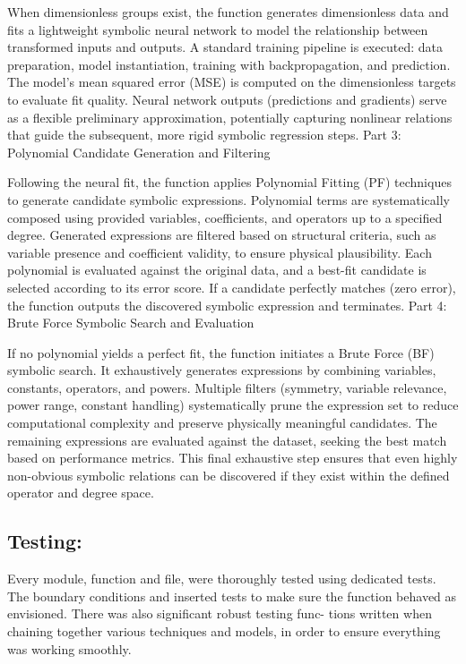 \documentclass{article}
\begin{document}
When dimensionless groups exist, the function generates dimensionless data and fits a lightweight symbolic neural network to model the relationship between transformed inputs and outputs. A standard training pipeline is executed: data preparation, model instantiation, training with backpropagation, and prediction. The model’s mean squared error (MSE) is computed on the dimensionless targets to evaluate fit quality. Neural network outputs (predictions and gradients) serve as a flexible preliminary approximation, potentially capturing nonlinear relations that guide the subsequent, more rigid symbolic regression steps.
Part 3: Polynomial Candidate Generation and Filtering

Following the neural fit, the function applies Polynomial Fitting (PF) techniques to generate candidate symbolic expressions. Polynomial terms are systematically composed using provided variables, coefficients, and operators up to a specified degree. Generated expressions are filtered based on structural criteria, such as variable presence and coefficient validity, to ensure physical plausibility. Each polynomial is evaluated against the original data, and a best-fit candidate is selected according to its error score. If a candidate perfectly matches (zero error), the function outputs the discovered symbolic expression and terminates.
Part 4: Brute Force Symbolic Search and Evaluation

If no polynomial yields a perfect fit, the function initiates a Brute Force (BF) symbolic search. It exhaustively generates expressions by combining variables, constants, operators, and powers. Multiple filters (symmetry, variable relevance, power range, constant handling) systematically prune the expression set to reduce computational complexity and preserve physically meaningful candidates. The remaining expressions are evaluated against the dataset, seeking the best match based on performance metrics. This final exhaustive step ensures that even highly non-obvious symbolic relations can be discovered if they exist within the defined operator and degree space.

\subsection{Testing:}
Every module, function and file, were thoroughly tested using dedicated tests. The boundary conditions and
inserted tests to make sure the function behaved as envisioned. There was also significant robust testing func-
tions written when chaining together various techniques and models, in order to ensure everything was working
smoothly.\\
\end{document}
